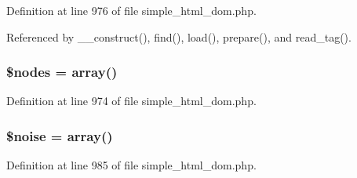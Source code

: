 Definition at line 976 of file simple\+\_\+html\+\_\+dom.\+php.



Referenced by \+\_\+\+\_\+construct(), find(), load(), prepare(), and read\+\_\+tag().

\hypertarget{classsimple__html__dom_afc84f46342a660cca8589570197bc421}{}
\subsubsection[{\$nodes}]{\setlength{\rightskip}{0pt plus 5cm}\$nodes = array()}\label{classsimple__html__dom_afc84f46342a660cca8589570197bc421}


Definition at line 974 of file simple\+\_\+html\+\_\+dom.\+php.

\hypertarget{classsimple__html__dom_a2774f17621ab4d3b64411f86c88df407}{}
\subsubsection[{\$noise}]{\setlength{\rightskip}{0pt plus 5cm}\$noise = array()\hspace{0.3cm}{\ttfamily [protected]}}\label{classsimple__html__dom_a2774f17621ab4d3b64411f86c88df407}


Definition at line 985 of file simple\+\_\+html\+\_\+dom.\+php.

\hypertarget{classsimple__html__dom_a0aa8137deceff2940ae24f30bdb37379}{}
